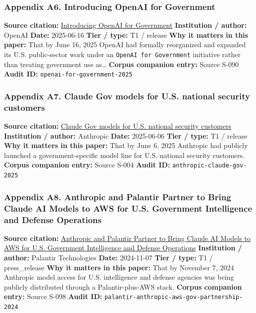 \documentclass[
  american,
  11pt,
  letterpaper,
]{article}
\begin{document}
\subsubsection{Appendix A6. Introducing OpenAI for
Government}\label{ch-07-appendix-a6-introducing-openai-for-government}

\textbf{Source citation:}
\href{https://openai.com/global-affairs/introducing-openai-for-government/}{Introducing
OpenAI for Government} \textbf{Institution / author:} OpenAI
\textbf{Date:} 2025-06-16 \textbf{Tier / type:} T1 / release \textbf{Why
it matters in this paper:} That by June 16, 2025 OpenAI had formally
reorganized and expanded its U.S. public-sector work under an
\texttt{OpenAI\ for\ Government} initiative rather than treating
government use as\ldots{} \textbf{Corpus companion entry:} Source S-090
\textbf{Audit ID:} \texttt{openai-for-government-2025}

\subsubsection{Appendix A7. Claude Gov models for U.S. national security
customers}\label{ch-07-appendix-a7-claude-gov-models-for-u-s-national-security-customers}

\textbf{Source citation:}
\href{https://www.anthropic.com/news/claude-gov-models-for-u-s-national-security-customers}{Claude
Gov models for U.S. national security customers} \textbf{Institution /
author:} Anthropic \textbf{Date:} 2025-06-06 \textbf{Tier / type:} T1 /
release \textbf{Why it matters in this paper:} That by June 6, 2025
Anthropic had publicly launched a government-specific model line for
U.S. national security customers. \textbf{Corpus companion entry:}
Source S-004 \textbf{Audit ID:} \texttt{anthropic-claude-gov-2025}

\subsubsection{Appendix A8. Anthropic and Palantir Partner to Bring
Claude AI Models to AWS for U.S. Government Intelligence and Defense
Operations}\label{ch-07-appendix-a8-anthropic-and-palantir-partner-to-bring-claude-ai-models-to-aws-for-u-s-government-intelligence-and-defense-operations}

\textbf{Source citation:}
\href{https://investors.palantir.com/news-details/2024/Anthropic-and-Palantir-Partner-to-Bring-Claude-AI-Models-to-AWS-for-U.S.-Government-Intelligence-and-Defense-Operations/}{Anthropic
and Palantir Partner to Bring Claude AI Models to AWS for U.S.
Government Intelligence and Defense Operations} \textbf{Institution /
author:} Palantir Technologies \textbf{Date:} 2024-11-07 \textbf{Tier /
type:} T1 / press\_release \textbf{Why it matters in this paper:} That
by November 7, 2024 Anthropic model access for U.S. intelligence and
defense agencies was being publicly distributed through a
Palantir-plus-AWS stack. \textbf{Corpus companion entry:} Source S-098
\textbf{Audit ID:} \texttt{palantir-anthropic-aws-gov-partnership-2024}
\end{document}
